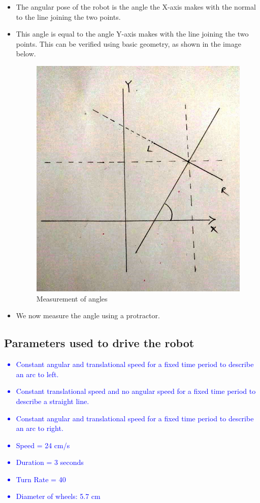 \documentclass[10pt,a4paper]{article}
\begin{document}
{\begin{itemize}
\begin{itemize}
							\item The angular pose of the robot is the angle the X-axis makes with the normal to the line joining the two points.
							\item This angle is equal to the angle Y-axis makes with the line joining the two points. This can be verified using basic geometry, as shown in the image below.
							\begin{figure}[h]
								\centering
								\includegraphics[width=0.4\linewidth]{img/angles.jpeg}
								\caption{Measurement of angles}
								\label{fig:angGeometry}
							\end{figure}
							\item We now measure the angle using a protractor.
						\end{itemize}
				\end{itemize}
				}
			\subsection{Parameters used to drive the robot}\textcolor{blue}{
				\begin{itemize}
					\item Constant angular and translational speed for a fixed time period to describe an arc to left.
					\item Constant translational speed and no angular speed for a fixed time period to describe a straight line.
					\item Constant angular and translational speed for a fixed time period to describe an arc to right.
					\item Speed = 24 cm/s
					\item Duration = 3 seconds
					\item Turn Rate = 40
					\item Diameter of wheels: 5.7 cm
				\end{itemize}
			}
\end{document}
